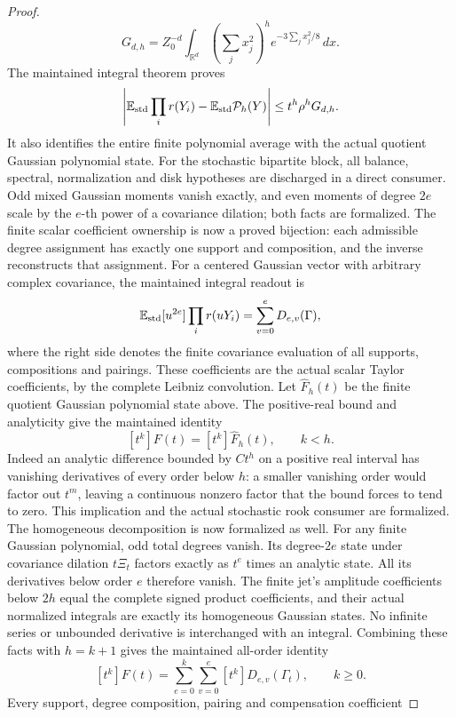 \begin{proof}
\[
 G_{d,h}=Z_0^{-d}\int_{\mathbb R^d}
          \left(\sum_jx_j^2\right)^h
                         e^{-3\sum_jx_j^2/8}\,dx.
\]
The maintained integral theorem proves
\[
 \left|\mathbb E_{\rm std}\prod_i r(Y_i)
                -\mathbb E_{\rm std}{\cal P}_h(Y)\right|
                         \leq t^h\rho^h G_{d,h}.
\]
It also identifies the entire finite polynomial average with the
actual quotient Gaussian polynomial state. For the stochastic
bipartite block, all balance, spectral, normalization and disk
hypotheses are discharged in a direct consumer.
Odd mixed Gaussian moments vanish exactly, and even moments of
degree \(2e\) scale by the \(e\)-th power of a covariance dilation;
both facts are formalized.
The finite scalar coefficient ownership is now a proved bijection:
each admissible degree assignment has exactly one support and composition,
and the inverse reconstructs that assignment. For a centered Gaussian
vector with arbitrary complex covariance, the maintained integral readout is
\[
 \mathbb E_{\rm std}[u^{2e}]\prod_i r(uY_i)
       =\sum_{v=0}^{e}D_{e,v}(\Gamma),
\]
where the right side denotes the finite covariance evaluation of all
supports, compositions and pairings. These coefficients are the actual
scalar Taylor coefficients, by the complete Leibniz convolution.
Let \(\widehat F_h(t)\) be the finite quotient Gaussian polynomial state
above. The positive-real bound and analyticity give the maintained identity
\[
 [t^k]F(t)=[t^k]\widehat F_h(t),\qquad k<h.
\]
Indeed an analytic difference bounded by \(Ct^h\) on a positive real
interval has vanishing derivatives of every order below \(h\): a smaller
vanishing order would factor out \(t^m\), leaving a continuous nonzero
factor that the bound forces to tend to zero. This implication and the
actual stochastic rook consumer are formalized.
The homogeneous decomposition is now formalized as well. For any finite
Gaussian polynomial, odd total degrees vanish. Its degree-\(2e\) state
under covariance dilation \(t\Xi_t\) factors exactly as \(t^e\) times
an analytic state. All its derivatives below order \(e\) therefore vanish.
The finite jet's amplitude coefficients below \(2h\) equal the complete
signed product coefficients, and their actual normalized integrals are
exactly its homogeneous Gaussian states. No infinite series or unbounded
derivative is interchanged with an integral.
Combining these facts with \(h=k+1\) gives the maintained all-order identity
\[
 [t^k]F(t)
   =\sum_{e=0}^{k}\sum_{v=0}^{e}
                  [t^k]D_{e,v}(\Gamma_t),\qquad k\geq0.
\]
Every support, degree composition, pairing and compensation coefficient

\end{proof}
